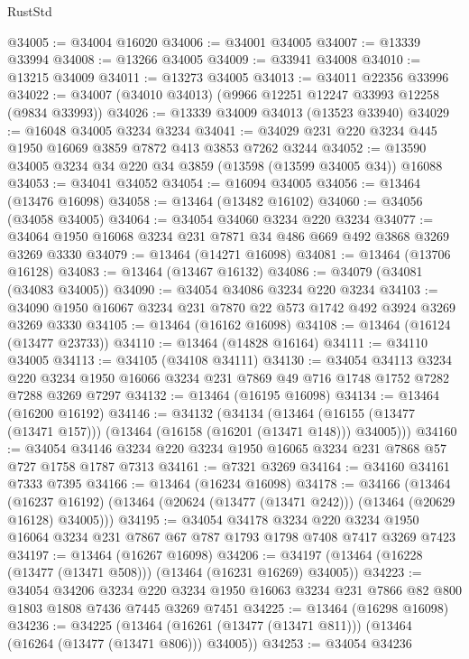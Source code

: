 \begin{lexlean}{RustStd}
\begin{coremodule}
@34005 := @34004 @16020
@34006 := @34001 @34005
@34007 := @13339 @33994
@34008 := @13266 @34005
@34009 := @33941 @34008
@34010 := @13215 @34009
@34011 := @13273 @34005
@34013 := @34011 @22356 @33996
@34022 := @34007 (@34010 @34013) (@9966 @12251 @12247 @33993 @12258 (@9834 @33993))
@34026 := @13339 @34009 @34013 (@13523 @33940)
@34029 := @16048 @34005 @3234 @3234
@34041 := @34029 @231 @220 @3234 @445 @1950 @16069 @3859 @7872 @413 @3853 @7262 @3244
@34052 := @13590 @34005 @3234 @34 @220 @34 @3859 (@13598 (@13599 @34005 @34)) @16088
@34053 := @34041 @34052
@34054 := @16094 @34005
@34056 := @13464 (@13476 @16098)
@34058 := @13464 (@13482 @16102)
@34060 := @34056 (@34058 @34005)
@34064 := @34054 @34060 @3234 @220 @3234
@34077 := @34064 @1950 @16068 @3234 @231 @7871 @34 @486 @669 @492 @3868 @3269 @3269 @3330
@34079 := @13464 (@14271 @16098)
@34081 := @13464 (@13706 @16128)
@34083 := @13464 (@13467 @16132)
@34086 := @34079 (@34081 (@34083 @34005))
@34090 := @34054 @34086 @3234 @220 @3234
@34103 := @34090 @1950 @16067 @3234 @231 @7870 @22 @573 @1742 @492 @3924 @3269 @3269 @3330
@34105 := @13464 (@16162 @16098)
@34108 := @13464 (@16124 (@13477 @23733))
@34110 := @13464 (@14828 @16164)
@34111 := @34110 @34005
@34113 := @34105 (@34108 @34111)
@34130 := @34054
    @34113
    @3234
    @220
    @3234
    @1950
    @16066
    @3234
    @231
    @7869
    @49
    @716
    @1748
    @1752
    @7282
    @7288
    @3269
    @7297
@34132 := @13464 (@16195 @16098)
@34134 := @13464 (@16200 @16192)
@34146 := @34132
    (@34134
      (@13464 (@16155 (@13477 (@13471 @157))) (@13464 (@16158 (@16201 (@13471 @148))) @34005)))
@34160 := @34054 @34146 @3234 @220 @3234 @1950 @16065 @3234 @231 @7868 @57 @727 @1758 @1787 @7313
@34161 := @7321 @3269
@34164 := @34160 @34161 @7333 @7395
@34166 := @13464 (@16234 @16098)
@34178 := @34166
    (@13464
      (@16237 @16192)
      (@13464 (@20624 (@13477 (@13471 @242))) (@13464 (@20629 @16128) @34005)))
@34195 := @34054
    @34178
    @3234
    @220
    @3234
    @1950
    @16064
    @3234
    @231
    @7867
    @67
    @787
    @1793
    @1798
    @7408
    @7417
    @3269
    @7423
@34197 := @13464 (@16267 @16098)
@34206 := @34197 (@13464 (@16228 (@13477 (@13471 @508))) (@13464 (@16231 @16269) @34005))
@34223 := @34054
    @34206
    @3234
    @220
    @3234
    @1950
    @16063
    @3234
    @231
    @7866
    @82
    @800
    @1803
    @1808
    @7436
    @7445
    @3269
    @7451
@34225 := @13464 (@16298 @16098)
@34236 := @34225
    (@13464 (@16261 (@13477 (@13471 @811))) (@13464 (@16264 (@13477 (@13471 @806))) @34005))
@34253 := @34054
    @34236

\end{coremodule}
\end{lexlean}
